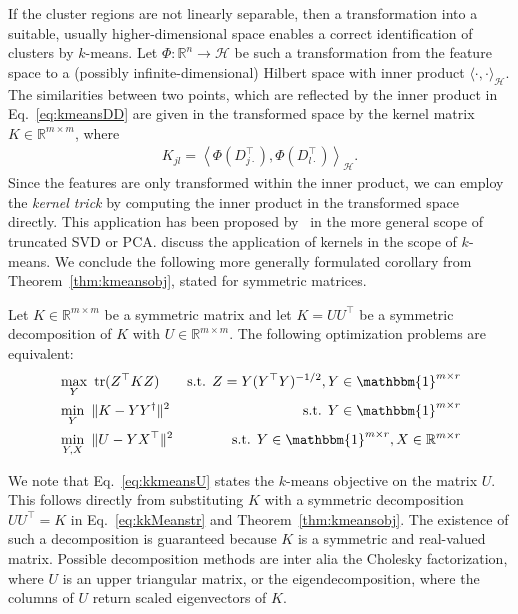 If the cluster regions are not linearly separable, then a transformation into a suitable, usually higher-dimensional space enables a correct identification of clusters by $k$-means. Let $\Phi:\mathbb{R}^n\rightarrow \mathcal{H}$ be such a transformation from the feature space to a (possibly infinite-dimensional) Hilbert space with inner product $\langle\cdot,\cdot\rangle_\mathcal{H}$. The similarities between two points, which are reflected by the inner product in Eq.~\eqref{eq:kmeansDD} are given in the transformed space by the kernel matrix $K\in\mathbb{R}^{m\times m}$, where   
\begin{align}
K_{jl} = \left\langle\Phi(D_{j\cdot}^\top),\Phi(D_{l\cdot}^\top)\right\rangle_\mathcal{H}. \label{eq:kernel}
\end{align}
Since the features are only transformed within the inner product, we can employ the \emph{kernel trick} by computing the inner product in the transformed space directly. This application has been proposed by~\cite{scholkopf1998nonlinear} in the more general scope of truncated SVD or PCA. \cite{ding2005equivalence} discuss the application of kernels in the scope of $k$-means. 
We conclude the following more generally formulated corollary from Theorem~\ref{thm:kmeansobj}, stated for symmetric matrices.
\begin{corollary}\label{thm:kkmeansobj}
Let $K\in\mathbb{R}^{m\times m}$ be a symmetric matrix and let $K=UU^\top$ be a symmetric decomposition of $K$ with $U\in\mathbb{R}^{m\times m}$. The following optimization problems are equivalent:
\begin{align}
&\max_{Y}\ \tr(Z^\top K Z)  & \text{s.t. } Z=Y(Y^\top Y)^{-1/2}, Y\in\mathbbm{1}^{m\times r}\label{eq:kkMeanstr}\\
&\min_{Y}\ \|K - YY^\dagger\|^2 & \text{s.t. }  Y\in\mathbbm{1}^{m\times r}\label{eq:kkMeansnorm}\\
&\min_{Y,X}\ \|U-YX^\top\|^2 & \text{s.t. } Y\in\mathbbm{1}^{m\times r}, X\in\mathbb{R}^{m\times r} \label{eq:kkmeansU}
\end{align}
\end{corollary}
We note that Eq.~\eqref{eq:kkmeansU} states the $k$-means objective on the matrix $U$. This follows directly from substituting $K$ with a symmetric decomposition $UU^\top=K$ in Eq.~\eqref{eq:kkMeanstr} and Theorem~\ref{thm:kmeansobj}. The existence of such a decomposition is guaranteed because $K$ is a symmetric and real-valued matrix. Possible decomposition methods are inter alia the Cholesky factorization, where $U$ is an upper triangular matrix, or the eigendecomposition, where the columns of $U$ return scaled eigenvectors of $K$.    
